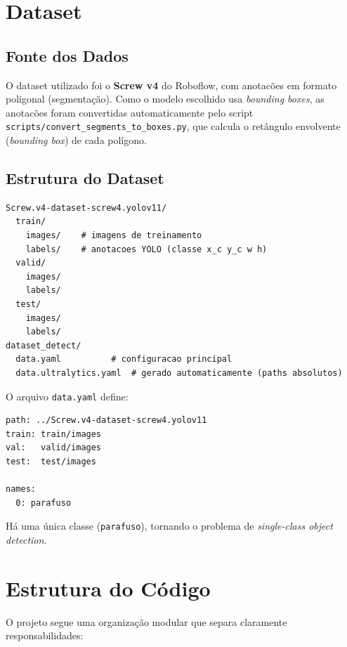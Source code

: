 \documentclass[12pt,a4paper]{article}
\begin{document}
\section{Dataset}

\subsection{Fonte dos Dados}

O dataset utilizado foi o \textbf{Screw v4} do Roboflow, com anotac\~oes em formato
poligonal (segmenta\c{c}\~ao). Como o modelo escolhido usa \emph{bounding boxes}, as
anotac\~oes foram convertidas automaticamente pelo script
\texttt{scripts/convert\_segments\_to\_boxes.py}, que calcula o ret\^angulo envolvente
(\emph{bounding box}) de cada pol\'igono.

\subsection{Estrutura do Dataset}

\begin{verbatim}
Screw.v4-dataset-screw4.yolov11/
  train/
    images/    # imagens de treinamento
    labels/    # anotacoes YOLO (classe x_c y_c w h)
  valid/
    images/
    labels/
  test/
    images/
    labels/
dataset_detect/
  data.yaml          # configuracao principal
  data.ultralytics.yaml  # gerado automaticamente (paths absolutos)
\end{verbatim}

O arquivo \texttt{data.yaml} define:

\begin{lstlisting}[caption={Configurac\~ao do dataset (\texttt{dataset/data.yaml})}]
path: ../Screw.v4-dataset-screw4.yolov11
train: train/images
val:   valid/images
test:  test/images

names:
  0: parafuso
\end{lstlisting}

H\'a uma \'unica classe (\texttt{parafuso}), tornando o problema de
\emph{single-class object detection}.

\section{Estrutura do C\'odigo}

O projeto segue uma organiza\c{c}\~ao modular que separa claramente responsabilidades:
\end{document}
